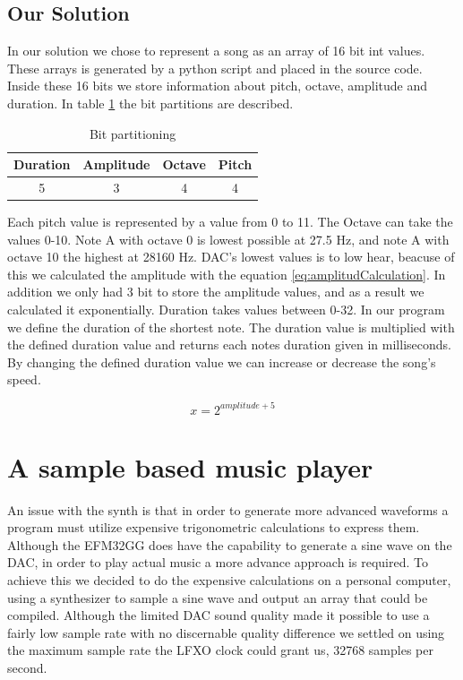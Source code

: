 \subsection{Our Solution}
In our solution we chose to represent a song as an array of 16 bit int values. These arrays is generated by a python script and placed in the source code. Inside these 16 bits we store information about pitch, octave, amplitude and duration. In table \ref{tab:bitFields} the bit partitions are described.
\begin{table}[H]
	\begin{center}
	\begin{tabular}{ |c|c|c|c| }
	  \hline
	  Duration & Amplitude & Octave & Pitch \\
	  \hline
	  5 & 3 & 4 & 4 \\
	  \hline

	\end{tabular}
	\caption{Bit partitioning}
	\label{tab:bitFields}
	\end{center}
\end{table}

Each pitch value is represented by a value from 0 to 11. The Octave can take the values 0-10. Note A with octave 0 is lowest possible at 27.5 Hz, and note A with octave 10 the highest at 28160 Hz. DAC's lowest values is to low hear, beacuse of this we calculated the amplitude with the equation \ref{eq:amplitudCalculation}. In addition we only had 3 bit to store the amplitude values, and as a result we calculated it exponentially. Duration takes values between 0-32. In our program we define the duration of the shortest note. The duration value is multiplied with the defined duration value and returns each notes duration given in milliseconds. By changing the defined duration value we can increase or decrease the song's speed.

\begin{equation}
  x = 2^{amplitude + 5}
  \label{eq:amplitudCalculation}
\end{equation}


\section{A sample based music player}
An issue with the synth is that in order to generate more advanced waveforms a program must utilize expensive trigonometric calculations to express them. Although the EFM32GG does have the capability to generate a sine wave on the DAC, in order to play actual music a more advance approach is required. To achieve this we decided to do the expensive calculations on a personal computer, using a synthesizer to sample a sine wave and output an array that could be compiled. Although the limited DAC sound quality made it possible to use a fairly low sample rate with no discernable quality difference we settled on using the maximum sample rate the LFXO clock could grant us, 32768 samples per second. 

